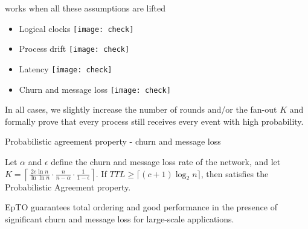 \begin{frame}{\EPTO{} works when all these assumptions are lifted}

  \begin{itemize}

  \item Logical clocks \texttt{[image: check]}

  \item Process drift  \texttt{[image: check]}

  \item Latency  \texttt{[image: check]}

  \item Churn and message loss \texttt{[image: check]}

  \end{itemize}

  \begin{snugshade}
    In all cases, we slightly increase the number of rounds and/or the fan-out $K$ and formally prove that every process still receives every event with high probability.
  \end{snugshade}

\end{frame}


\begin{frame}{Probabilistic agreement property - churn and message loss}
  
\begin{lemma}
\label{lem:churn}
Let $\alpha$ and $\epsilon$ define the churn and message loss rate of the network, and let $K=\left\lceil\frac{2e \ln n}{\ln \ln n} \cdot \frac{n}{n-\alpha}\cdot\frac{1}{1-\epsilon}\right\rceil$. If $TTL \geq \lceil (c+1) \log_2 n \rceil$, then \EPTO{} satisfies the Probabilistic Agreement property.
\end{lemma}




\begin{snugshade}
  EpTO guarantees total ordering and good performance in the presence of significant churn and message loss for large-scale applications.
\end{snugshade}

\end{frame}

